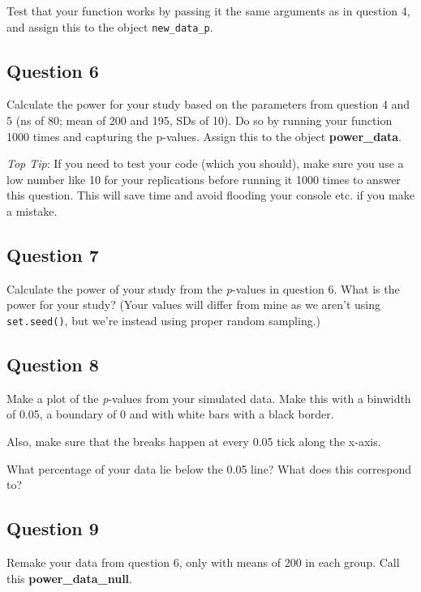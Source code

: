 \documentclass[
]{book}
\begin{document}
Test that your function works by passing it the same arguments as in question 4, and assign this to the object \texttt{new\_data\_p}.

\hypertarget{question-6-7}{%
\subsection{Question 6}\label{question-6-7}}

Calculate the power for your study based on the parameters from question 4 and 5 (ns of 80; mean of 200 and 195, SDs of 10). Do so by running your function 1000 times and capturing the p-values. Assign this to the object \textbf{power\_data}.

\emph{Top Tip}: If you need to test your code (which you should), make sure you use a low number like 10 for your replications before running it 1000 times to answer this question. This will save time and avoid flooding your console etc. if you make a mistake.

\hypertarget{question-7-6}{%
\subsection{Question 7}\label{question-7-6}}

Calculate the power of your study from the \emph{p}-values in question 6. What is the power for your study? (Your values will differ from mine as we aren't using \texttt{set.seed()}, but we're instead using proper random sampling.)

\hypertarget{question-8-6}{%
\subsection{Question 8}\label{question-8-6}}

Make a plot of the \emph{p}-values from your simulated data. Make this with a binwidth of 0.05, a boundary of 0 and with white bars with a black border.

Also, make sure that the breaks happen at every 0.05 tick along the x-axis.

What percentage of your data lie below the 0.05 line? What does this correspond to?

\hypertarget{question-9-6}{%
\subsection{Question 9}\label{question-9-6}}

Remake your data from question 6, only with means of 200 in each group. Call this \textbf{power\_data\_null}.
\end{document}
